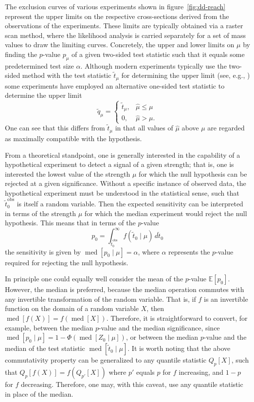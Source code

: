 \documentclass[b5paper, 10pt, twoside]{book}
\newcommand{\difd}{\,d}
\DeclareMathOperator{\med}{med}
\begin{document}
The exclusion curves of various experiments shown in figure~\ref{fig:dd-reach} represent the upper limits on the respective cross-sections derived from the observations of the experiments. These limits are typically obtained via a raster scan method, where the likelihood analysis is carried separately for a set of mass values to draw the limiting curves. Concretely, the upper and lower limits on $\mu$ by finding the $p$-value $p_\mu$ of a given two-sided test statistic such that it equals some predetermined test size $\alpha$. Although modern experiments typically use the two-sided method with the test statistic $\tilde{t}_\mu$ for determining the upper limit (see, e.g., \textcites{XENON2019b, PandaX2021, LZ2024}) some experiments have employed an alternative one-sided test statistic to determine the upper limit \parencite{CowanEtAl2011}
\begin{equation}
    \tilde{q}_\mu=
    \begin{cases}
        \tilde{t}_\mu,&\hat{\mu}\leq\mu\\
        0,&\hat{\mu}>\mu.
    \end{cases}
\end{equation}
One can see that this differs from $\tilde{t}_\mu$ in that all values of $\hat{\mu}$ above $\mu$ are regarded as maximally compatible with the hypothesis.

From a theoretical standpoint, one is generally interested in the capability of a hypothetical experiment to detect a signal of a given strength; that is, one is interested the lowest value of the strength $\mu$ for which the null hypothesis can be rejected at a given significance. Without a specific instance of observed data, the hypothetical experiment must be understood in the statistical sense, such that $\tilde{t}_0^\text{obs}$ is itself a random variable. Then the expected sensitivity can be interpreted in terms of the strength $\mu$ for which the median experiment would reject the null hypothesis. This means that in terms of the $p$-value
\begin{equation}
    p_0=\int_{\tilde{t}_0^\text{obs}}^\infty f(\tilde{t}_0\mid\mu)\difd\tilde{t}_0
\end{equation}
the sensitivity is given by $\med[p_0\mid\mu]=\alpha$, where $\alpha$ represents the $p$-value required for rejecting the null hypothesis.

In principle one could equally well consider the mean of the $p$-value $\mathbb{E}[p_0]$. However, the median is preferred, because the median operation commutes with any invertible transformation of the random variable. That is, if $f$ is an invertible function on the domain of a random variable $X$, then $\med[f(X)]=f(\med[X])$. Therefore, it is straightforward to convert, for example, between the median $p$-value and the median significance, since $\med[p_0\mid\mu]=1-\Phi(\med[Z_0\mid\mu])$, or between the median $p$-value and the median of the test statistic $\med[\tilde{t}_0\mid\mu]$. It is worth noting that the above commutativity property can be generalized to any quantile statistic $Q_p[X]$, such that $Q_p[f(X)]=f(Q_{p'}[X])$ where $p'$ equals $p$ for $f$ increasing, and $1-p$ for $f$ decreasing. Therefore, one may, with this caveat, use any quantile statistic in place of the median.
\end{document}
